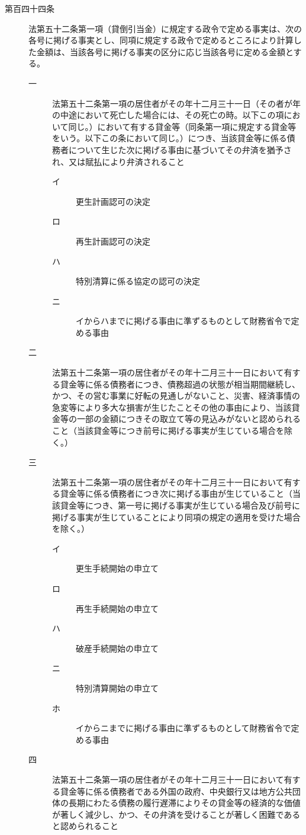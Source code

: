 \documentclass[twocolumn,a4j,10pt]{ltjtarticle}
\begin{document}
\begin{description}
\item[第百四十四条]法第五十二条第一項（貸倒引当金）に規定する政令で定める事実は、次の各号に掲げる事実とし、同項に規定する政令で定めるところにより計算した金額は、当該各号に掲げる事実の区分に応じ当該各号に定める金額とする。
\begin{description}
\item[一]法第五十二条第一項の居住者がその年十二月三十一日（その者が年の中途において死亡した場合には、その死亡の時。以下この項において同じ。）において有する貸金等（同条第一項に規定する貸金等をいう。以下この条において同じ。）につき、当該貸金等に係る債務者について生じた次に掲げる事由に基づいてその弁済を猶予され、又は賦払により弁済されること
\begin{description}
\item[イ]更生計画認可の決定
\item[ロ]再生計画認可の決定
\item[ハ]特別清算に係る協定の認可の決定
\item[ニ]イからハまでに掲げる事由に準ずるものとして財務省令で定める事由
\end{description}
\item[二]法第五十二条第一項の居住者がその年十二月三十一日において有する貸金等に係る債務者につき、債務超過の状態が相当期間継続し、かつ、その営む事業に好転の見通しがないこと、災害、経済事情の急変等により多大な損害が生じたことその他の事由により、当該貸金等の一部の金額につきその取立て等の見込みがないと認められること（当該貸金等につき前号に掲げる事実が生じている場合を除く。）
\item[三]法第五十二条第一項の居住者がその年十二月三十一日において有する貸金等に係る債務者につき次に掲げる事由が生じていること（当該貸金等につき、第一号に掲げる事実が生じている場合及び前号に掲げる事実が生じていることにより同項の規定の適用を受けた場合を除く。）
\begin{description}
\item[イ]更生手続開始の申立て
\item[ロ]再生手続開始の申立て
\item[ハ]破産手続開始の申立て
\item[ニ]特別清算開始の申立て
\item[ホ]イからニまでに掲げる事由に準ずるものとして財務省令で定める事由
\end{description}
\item[四]法第五十二条第一項の居住者がその年十二月三十一日において有する貸金等に係る債務者である外国の政府、中央銀行又は地方公共団体の長期にわたる債務の履行遅滞によりその貸金等の経済的な価値が著しく減少し、かつ、その弁済を受けることが著しく困難であると認められること

\end{description}
\end{description}
\end{document}
